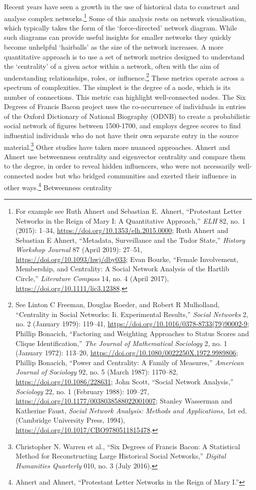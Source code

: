 \documentclass[]{article}
\begin{document}
Recent years have seen a growth in the use of historical data to construct and analyse complex networks.\footnote{For example see Ruth Ahnert and Sebastian E. Ahnert, ``Protestant Letter Networks in the Reign of Mary I: A Quantitative Approach,'' \emph{ELH} 82, no. 1 (2015): 1--34, \url{https://doi.org/10.1353/elh.2015.0000}; Ruth Ahnert and Sebastian E Ahnert, ``Metadata, Surveillance and the Tudor State,'' \emph{History Workshop Journal} 87 (April 2019): 27--51, \url{https://doi.org/10.1093/hwj/dby033}; Evan Bourke, ``Female Involvement, Membership, and Centrality: A Social Network Analysis of the Hartlib Circle,'' \emph{Literature Compass} 14, no. 4 (April 2017), \url{https://doi.org/10.1111/lic3.12388}.} Some of this analysis rests on network visualisation, which typically takes the form of the `force-directed' network diagram. While such diagrams can provide useful insights for smaller networks they quickly become unhelpful `hairballs' as the size of the network increases. A more quantitative approach is to use a set of network metrics designed to understand the `centrality' of a given actor within a network, often with the aim of understanding relationships, roles, or influence.\footnote{See Linton C Freeman, Douglas Roeder, and Robert R Mulholland, ``Centrality in Social Networks: Ii. Experimental Results,'' \emph{Social Networks} 2, no. 2 (January 1979): 119--41, \url{https://doi.org/10.1016/0378-8733(79)90002-9}; Phillip Bonacich, ``Factoring and Weighting Approaches to Status Scores and Clique Identification,'' \emph{The Journal of Mathematical Sociology} 2, no. 1 (January 1972): 113--20, \url{https://doi.org/10.1080/0022250X.1972.9989806}; Phillip Bonacich, ``Power and Centrality: A Family of Measures,'' \emph{American Journal of Sociology} 92, no. 5 (March 1987): 1170--82, \url{https://doi.org/10.1086/228631}; John Scott, ``Social Network Analysis,'' \emph{Sociology} 22, no. 1 (February 1988): 109--27, \url{https://doi.org/10.1177/0038038588022001007}; Stanley Wasserman and Katherine Faust, \emph{Social Network Analysis: Methods and Applications}, 1st ed. (Cambridge University Press, 1994), \url{https://doi.org/10.1017/CBO9780511815478}.} These metrics operate across a spectrum of complexities. The simplest is the degree of a node, which is its number of connections. This metric can highlight well-connected nodes. The Six Degrees of Francis Bacon project uses the co-occurrence of individuals in entries of the Oxford Dictionary of National Biography (ODNB) to create a probabilistic social network of figures between 1500-1700, and employs degree scores to find influential individuals who do not have their own separate entry in the source material.\footnote{Christopher N. Warren et al., ``Six Degrees of Francis Bacon: A Statistical Method for Reconstructing Large Historical Social Networks,'' \emph{Digital Humanities Quarterly} 010, no. 3 (July 2016).} Other studies have taken more nuanced approaches. Ahnert and Ahnert use betweenness centrality and eigenvector centrality and compare them to the degree, in order to reveal hidden influencers, who were not necessarily well-connected nodes but who bridged communities and exerted their influence in other ways.\footnote{Ahnert and Ahnert, ``Protestant Letter Networks in the Reign of Mary I.''} Betweenness centrality 
\end{document}
